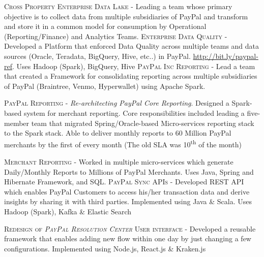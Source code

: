 \documentclass[11pt, a4paper, sans]{moderncv}
\begin{document}
{\textsc{Cross Property Enterprise Data Lake} - Leading a team whose primary objective is to collect data from multiple subsidiaries of PayPal and transform and store it in a common model for consumption by Operational (Reporting/Finance) and Analytics Teams. \newline
\newline \textsc{Enterprise Data Quality} - Developed a Platform that enforced Data Quality across multiple teams and data sources (Oracle, Teradata, BigQuery, Hive, etc..) in PayPal. \url{http://bit.ly/paypal-ref}. Uses Hadoop (Spark), BigQuery, Hive \newline
\newline \textsc{PayPal Inc Reporting} - Lead a team that created a Framework for consolidating reporting across multiple subsidiaries of PayPal (Braintree, Venmo, Hyperwallet) using Apache Spark. \newline} 

{\textsc{PayPal Reporting} - \textit{Re-architecting PayPal Core Reporting}.  Designed a Spark-based system for merchant reporting. Core responsibilities included leading a five-member team that migrated Spring/Oracle-based Micro-services reporting stack to the Spark stack. 
Able to deliver monthly reports to 60 Million PayPal merchants by the first of every month (The old SLA was 10\textsuperscript{th} of the month)  \newline} 

{\textsc{Merchant Reporting} - Worked in multiple micro-services which generate Daily/Monthly Reports to Millions of PayPal Merchants. Uses Java, Spring and Hibernate Framework, and SQL. \newline 
\newline \textsc{PayPal Sync APIs} - Developed REST API which enables PayPal Customers to access his/her transaction data and derive insights by sharing it with third parties. Implemented using Java \& Scala. Uses Hadoop (Spark), Kafka \& Elastic Search \newline} 

{\textsc{Redesign of \textit{PayPal Resolution Center} User interface} - Developed a reusable framework that enables adding new flow within one day by just changing a few configurations. Implemented using Node.js, React.js \& Kraken.js \newline} 
\end{document}
